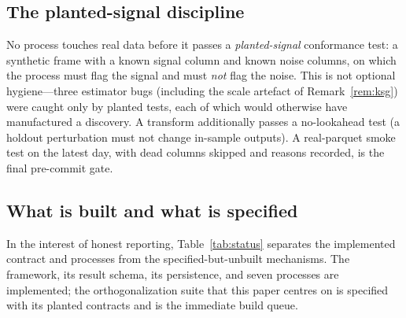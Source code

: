 \documentclass[11pt,a4paper]{article}
\theoremstyle{definition}
\theoremstyle{plain}
\begin{document}
\subsection{The planted-signal discipline}

No process touches real data before it passes a \emph{planted-signal} conformance test: a synthetic
frame with a known signal column and known noise columns, on which the process must flag the signal
and must \emph{not} flag the noise. This is not optional hygiene---three estimator bugs (including
the scale artefact of Remark~\ref{rem:ksg}) were caught only by planted tests, each of which would
otherwise have manufactured a discovery. A transform additionally passes a no-lookahead test (a
holdout perturbation must not change in-sample outputs). A real-parquet smoke test on the latest day,
with dead columns skipped and reasons recorded, is the final pre-commit gate.

\subsection{What is built and what is specified}

In the interest of honest reporting, Table~\ref{tab:status} separates the implemented contract and
processes from the specified-but-unbuilt mechanisms. The framework, its result schema, its
persistence, and seven processes are implemented; the orthogonalization suite that this paper
centres on is specified with its planted contracts and is the immediate build queue.
\end{document}
